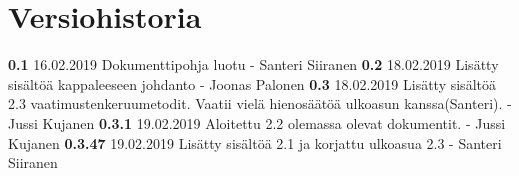 \chapter*{Versiohistoria}

\newcommand{\currentversion}{0.3.47} %

\textbf{0.1} 16.02.2019 Dokumenttipohja luotu - Santeri Siiranen \newline
\textbf{0.2} 18.02.2019 Lisätty sisältöä kappaleeseen johdanto - Joonas Palonen \newline
\textbf{0.3} 18.02.2019 Lisätty sisältöä 2.3 vaatimustenkeruumetodit. Vaatii vielä hienosäätöä ulkoasun kanssa(Santeri). - Jussi Kujanen \newline
\textbf{0.3.1} 19.02.2019 Aloitettu 2.2 olemassa olevat dokumentit. - Jussi Kujanen \newline
\textbf{0.3.47} 19.02.2019 Lisätty sisältöä 2.1 ja korjattu ulkoasua 2.3 - Santeri Siiranen \newline
